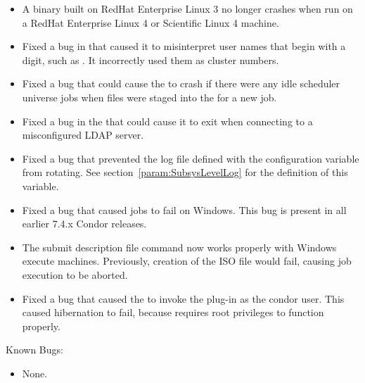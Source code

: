 \begin{itemize}
\item A  binary built on RedHat Enterprise Linux 3
no longer crashes
when run on a RedHat Enterprise Linux 4 or Scientific Linux 4 machine.

\item Fixed a bug in  that caused it to misinterpret user names
that begin with a digit, such as .
It incorrectly used them as cluster numbers. 

\item Fixed a bug that could cause the  to crash if there
were any idle scheduler universe jobs when files were staged into the
 for a new job.

\item Fixed a bug in the  that could cause it to exit
when connecting to a misconfigured LDAP server.

\item Fixed a bug that prevented the log file defined with the configuration
variable  from rotating.
See section~\ref{param:SubsysLevelLog} for the definition of this variable. 

\item Fixed a bug that caused  jobs to fail on Windows. 
This bug is present in all earlier 7.4.x Condor releases.

\item The submit description file command 
now works properly with Windows execute machines. 
Previously, creation of the ISO file would fail, 
causing job execution to be aborted.

\item Fixed a bug that caused the  to invoke the
   plug-in as the condor user.
  This caused hibernation to fail, 
  because  requires root privileges to function properly.

\end{itemize}

\noindent Known Bugs:

\begin{itemize}

\item None.

\end{itemize}

